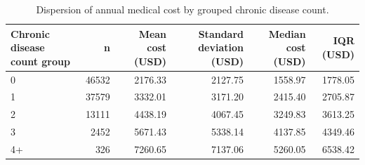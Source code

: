 \begin{table}
\caption{Dispersion of annual medical cost by grouped chronic disease count.}
\label{tab:02-variance-by-chronic-count}
\begin{tabular}{lrrrrr}
\toprule
Chronic disease count group & n & Mean cost (USD) & Standard deviation (USD) & Median cost (USD) & IQR (USD) \\
\midrule
0 & 46532 & 2176.33 & 2127.75 & 1558.97 & 1778.05 \\
1 & 37579 & 3332.01 & 3171.20 & 2415.40 & 2705.87 \\
2 & 13111 & 4438.19 & 4067.45 & 3249.83 & 3613.25 \\
3 & 2452 & 5671.43 & 5338.14 & 4137.85 & 4349.46 \\
4+ & 326 & 7260.65 & 7137.06 & 5260.05 & 6538.42 \\
\bottomrule
\end{tabular}
\end{table}
